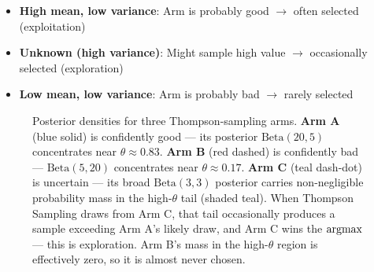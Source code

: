 \documentclass[11pt,a4paper]{article}
\theoremstyle{definition}
\theoremstyle{plain}
\newcommand{\argmax}{\operatornamewithlimits{argmax}}
\begin{document}
\begin{intuition}
\begin{itemize}
    \item \textbf{High mean, low variance}: Arm is probably good $\to$ often selected (exploitation)
    \item \textbf{Unknown (high variance)}: Might sample high value $\to$ occasionally selected (exploration)
    \item \textbf{Low mean, low variance}: Arm is probably bad $\to$ rarely selected
\end{itemize}
\end{intuition}

\begin{figure}[h]
\centering
{}
\caption{Posterior densities for three Thompson-sampling arms. \textbf{Arm A} (blue solid) is confidently good --- its posterior $\mathrm{Beta}(20,5)$ concentrates near $\theta \approx 0.83$. \textbf{Arm B} (red dashed) is confidently bad --- $\mathrm{Beta}(5,20)$ concentrates near $\theta \approx 0.17$. \textbf{Arm C} (teal dash-dot) is uncertain --- its broad $\mathrm{Beta}(3,3)$ posterior carries non-negligible probability mass in the high-$\theta$ tail (shaded teal). When Thompson Sampling draws from Arm C, that tail occasionally produces a sample exceeding Arm A's likely draw, and Arm C wins the $\argmax$ --- this is exploration. Arm B's mass in the high-$\theta$ region is effectively zero, so it is almost never chosen.}
\end{figure}
\end{document}
